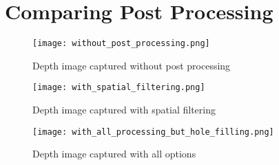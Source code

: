 
\section{Comparing Post Processing}
\label{appendix:postprocessing}
\begin{figure}[h]
\centering
\texttt{[image: without\_post\_processing.png]}
\caption{Depth image captured without post processing}
\end{figure}

\begin{figure}[h]
\texttt{[image: with\_spatial\_filtering.png]}
\caption{Depth image captured with spatial filtering}
\end{figure}

\begin{figure}[h]
\texttt{[image: with\_all\_processing\_but\_hole\_filling.png]}
\caption{Depth image captured with all options}
\end{figure}
